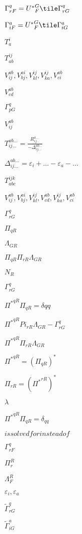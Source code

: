 \documentclass{article}
\begin{document}
$\Gamma^q_{rF} = {U^\ast}^G_F \tile\Gamma^q_{rG}$
\pagebreak

$\Gamma^a_{iF} = {U^\ast}^G_F \tile\Gamma^a_{iG}$
\pagebreak

$T_{a}^{i}$
\pagebreak

$T_{ab}^{ij}$
\pagebreak

$V_{ij}^{ab}, V_{bj}^{ai},
V_{kl}^{ij}, V_{ka}^{ij}, V_{ci}^{ab}$
\pagebreak

$V_{cd}^{ab}$
\pagebreak

$\Gamma_{pG}^q$
\pagebreak

$V_{ij}^{ab}$
\pagebreak

$T_{ij\ldots}^{ab\ldots} = \frac{R_{ij\ldots}^{a\ldots}}
{-\Delta_{ij\ldots}^{ab\ldots}}$
\pagebreak

$\Delta_{ij\ldots}^{ab\ldots} =
\varepsilon_i+\ldots-\varepsilon_a-\ldots$
\pagebreak

$T_{abc}^{ijk}$
\pagebreak

$V_{ij}^{ab}, V_{bj}^{ai},
V_{kl}^{ij}, V_{cd}^{ab}, V_{ka}^{ij}, V_{ci}^{ab}$
\pagebreak

$\Gamma_{rG}^q$
\pagebreak

$\Pi_{qR}$
\pagebreak

$\Lambda_{GR}$
\pagebreak

$\Pi_{qR}\Pi_{rR}\Lambda_{GR}$
\pagebreak

$N_R$
\pagebreak

$\Gamma^q_{rG}$
\pagebreak

${\Pi^\ast}^{qR}\Pi_{qR} = \delta{qq}$
\pagebreak

${\Pi^\ast}^{qR}Pi_{rR}\Lambda_{GR} - \Gamma^q_{rG}$
\pagebreak

${\Pi^\ast}^{qR}\Pi_{rR}\Lambda_{GR}$
\pagebreak

${\Pi^\ast}^{qR} = (\Pi_{qR})^\ast$
\pagebreak

$\Pi_{rR} = ({\Pi^\ast}^{rR})^\ast$
\pagebreak

$\lambda$
\pagebreak

${\Pi^\ast}^{qR}\Pi_{qR} = \delta_{qq}$
\pagebreak

$ is solved for
  instead of $
\pagebreak

$\Gamma^q_{rF}$
\pagebreak

$\Pi^R_r$
\pagebreak

$\Lambda^R_F$
\pagebreak

$\varepsilon_i, \varepsilon_a$
\pagebreak

$\tilde\Gamma^q_{rG}$
\pagebreak

$\tilde\Gamma^a_{iG}$
\pagebreak
\end{document}
